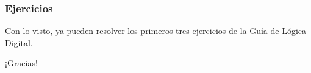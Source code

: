 \documentclass[aspectratio=169]{beamer}
\begin{document}
\begin{frame}[fragile]
    \frametitle{Ejercicios}
    Con lo visto, ya pueden resolver los primeros tres ejercicios de la Guía de Lógica Digital.
\end{frame}

\begin{frame}[plain]
    \begin{center}
    \vspace{2cm}
    \huge ¡Gracias!\\
    \vspace{2cm}
    \end{center}
\end{frame}
\end{document}
